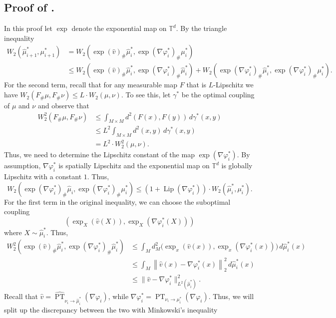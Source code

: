 \documentclass[11pt]{article}
\newcommand{\man}{M}
\newcommand{\PT}{\operatorname{PT}}
\begin{document}
\subsection{Proof of .} \label{proof of one step error of W traj reconstruction}
In this proof let $\exp$ denote the exponential map on $\mathbb{T}^d$. By the triangle inequality
\begin{align*}
    W_2(\hat\mu_{i+1}^*, \mu_{i+1}^*) &= W_2(\exp( \hat{v})_\#\hat{\mu}_i^*, \exp( \nabla\varphi_i^*)_\#\mu_i^*) \\
    &\leq W_2(\exp(\hat{v})_\#\hat{\mu}_i^*, \exp(\nabla\varphi_i^*)_\#\hat{\mu}_i^*) + W_2(\exp(\nabla\varphi_i^*)_\#\hat{\mu}_i^*, \exp(\nabla \varphi_i^*)_\#\mu_i^*).
\end{align*}
For the second term, recall that for any measurable map $F$ that is $L$-Lipschitz we have $W_2(F_\#\mu, F_\#\nu) \leq L\cdot W_2(\mu, \nu).$ To see this, let $\gamma^*$ be the optimal coupling of $\mu$ and $\nu$ and observe that
\begin{align*}
    W_2^2(F_\#\mu, F_\#\nu) &\leq \int_{\man \times \man}d^2(F(x), F(y))\,d\gamma^*(x,y) \\
    &\leq L^2\int_{\man \times \man}d^2(x, y)\,d\gamma^*(x,y) \\
    &= L^2\cdot W_2^2(\mu, \nu).
\end{align*}
Thus, we need to determine the Lipschitz constant of the map $\exp(\nabla\varphi_i^*)$. By assumption, $\nabla\varphi^*_i$ is spatially Lipschitz and the exponential map on $\mathbb{T}^d$ is globally Lipschitz with a constant $1$. Thus,
\[W_2(\exp(\nabla\varphi_i^*)_\#\hat{\mu}_i, \exp(\nabla \varphi_i^*)_\#\mu_i^*) \le (1 + {\operatorname{Lip}}(\nabla \varphi_i^*))\cdot W_2(\hat\mu_i^*, \mu_i^*).\]
For the first term in the original inequality, we can choose the suboptimal coupling 
\[(\exp_X(\hat{v}(X)), \exp_X(\nabla\varphi_i^*(X)))\] 
where $X \sim \hat\mu_i^*$. Thus,
\begin{align*}
    W_2^2(\exp(\hat v)_\#\hat{\mu}_i^*, \exp(\nabla\varphi_i^*)_\#\hat{\mu}_i^*) &\leq \int_{\man}d^2_{\man}\big(\exp_x(\hat{v}(x)), \exp_x(\nabla \varphi_i^*(x))\big) \, d\hat\mu_i^*(x) \\
    &\leq \int_{\man} \left\|\hat{v}(x) - \nabla\varphi_i^*(x)\right\|_{2}^2 \, d\hat\mu_i^*(x) \\
    &\leq  \|\hat{v} - \nabla\varphi_i^*\|_{L^2(\hat\mu_i^*)}^2.
\end{align*}
Recall that $\hat{v} = \widehat{{\PT}}_{\nu_i \rightarrow \hat\mu_i^*}(\nabla \varphi_i)$, while $\nabla\varphi_i^* = {\PT}_{\nu_i \rightarrow \mu_i^*}(\nabla \varphi_i)$. Thus, we will split up the discrepancy between the two with Minkowski's inequality
\end{document}
